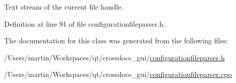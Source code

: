 Text stream of the current file handle. 



Definition at line 91 of file configurationfileparser.\+h.



The documentation for this class was generated from the following files\+:\begin{DoxyCompactItemize}
\item 
/\+Users/martin/\+Workspaces/qt/crossdocs\+\_\+gui/\hyperlink{configurationfileparser_8h}{configurationfileparser.\+h}\item 
/\+Users/martin/\+Workspaces/qt/crossdocs\+\_\+gui/\hyperlink{configurationfileparser_8cpp}{configurationfileparser.\+cpp}\end{DoxyCompactItemize}
